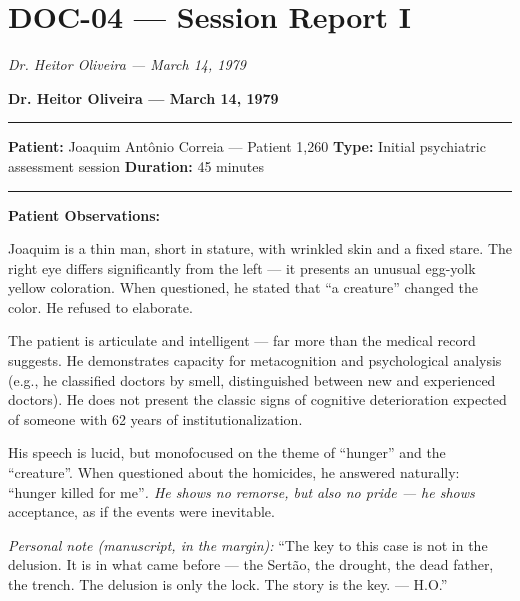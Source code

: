 \section*{\textbf{DOC-04} --- Session Report I}

\noindent \textit{Dr. Heitor Oliveira --- March 14, 1979}

\noindent \textbf{Dr. Heitor Oliveira --- March 14, 1979}

\vspace{0.5em}\noindent\rule{\textwidth}{0.5pt}\vspace{0.5em}

\noindent \textbf{Patient:} Joaquim Antônio Correia --- Patient 1,260
\textbf{Type:} Initial psychiatric assessment session
\textbf{Duration:} 45 minutes

\vspace{0.5em}\noindent\rule{\textwidth}{0.5pt}\vspace{0.5em}

\noindent \textbf{Patient Observations:}

\noindent Joaquim is a thin man, short in stature, with wrinkled skin and a fixed stare. The right eye differs significantly from the left --- it presents an unusual egg-yolk yellow coloration. When questioned, he stated that \textquotedblleft{}a creature\textquotedblright{} changed the color. He refused to elaborate.

\noindent The patient is articulate and intelligent --- far more than the medical record suggests. He demonstrates capacity for metacognition and psychological analysis (e.g., he classified doctors by smell, distinguished between new and experienced doctors). He does not present the classic signs of cognitive deterioration expected of someone with 62 years of institutionalization.

\noindent His speech is lucid, but monofocused on the theme of \textquotedblleft{}hunger\textquotedblright{} and the \textquotedblleft{}creature\textquotedblright{}. When questioned about the homicides, he answered naturally: \textquotedblleft{}hunger killed for me\textquotedblright{\textit{. He shows no remorse, but also no pride --- he shows }acceptance}, as if the events were inevitable.

\noindent \textit{Personal note (manuscript, in the margin):} \textquotedblleft{}The key to this case is not in the delusion. It is in what came before --- the Sertão, the drought, the dead father, the trench. The delusion is only the lock. The story is the key. --- H.O.\textquotedblright{}

